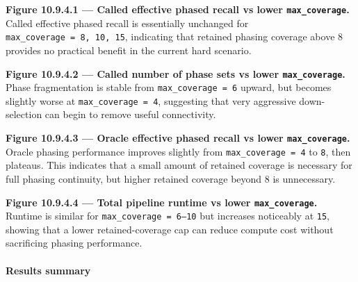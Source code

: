 \documentclass[
]{article}
\begin{document}
\textbf{Figure 10.9.4.1 --- Called effective phased recall vs lower
\texttt{max\_coverage}.}\\
Called effective phased recall is essentially unchanged for
\texttt{max\_coverage\ =\ 8,\ 10,\ 15}, indicating that retained phasing
coverage above 8 provides no practical benefit in the current hard
scenario.

\textbf{Figure 10.9.4.2 --- Called number of phase sets vs lower
\texttt{max\_coverage}.}\\
Phase fragmentation is stable from \texttt{max\_coverage\ =\ 6} upward,
but becomes slightly worse at \texttt{max\_coverage\ =\ 4}, suggesting
that very aggressive down-selection can begin to remove useful
connectivity.

\textbf{Figure 10.9.4.3 --- Oracle effective phased recall vs lower
\texttt{max\_coverage}.}\\
Oracle phasing performance improves slightly from
\texttt{max\_coverage\ =\ 4} to \texttt{8}, then plateaus. This
indicates that a small amount of retained coverage is necessary for full
phasing continuity, but higher retained coverage beyond 8 is
unnecessary.

\textbf{Figure 10.9.4.4 --- Total pipeline runtime vs lower
\texttt{max\_coverage}.}\\
Runtime is similar for \texttt{max\_coverage\ =\ 6–10} but increases
noticeably at \texttt{15}, showing that a lower retained-coverage cap
can reduce compute cost without sacrificing phasing performance.

\paragraph{Results summary}\label{results-summary-3}
\end{document}
